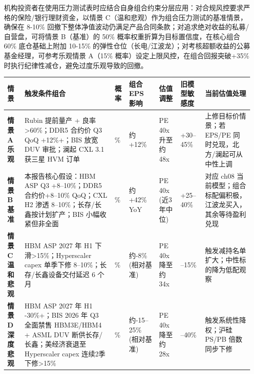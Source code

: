 机构投资者在使用压力测试表时应结合自身组合约束分层应用：对合规风控要求严格的保险/银行理财资金，以情景 C（温和悲观）作为组合压力测试的基准情景，确保在 8-10\% 回撤下整体净值波动仍满足产品合同条款；对追求绝对收益的私募/自营盘，可将情景 B（基准）的 50\% 概率权重折算为目标置信度，在核心组合 60\% 底仓基础上附加 10-15\% 的弹性仓位（长电/江波龙）；对考核超额收益的公募基金经理，可参考乐观情景 A（15\% 概率）设定上限风控，在组合回报突破+35\%时执行纪律性减仓，避免过度乐观导致的回撤。

\begin{exhibitbox}
\centering
\scriptsize
\renewcommand{\arraystretch}{1.25}
\begin{tabularx}{\exhibitboxwidth}{>{\bfseries}p{1.6cm} >{\raggedright\arraybackslash}p{3.8cm} >{\centering\arraybackslash}p{1.2cm} >{\raggedleft\arraybackslash}p{1.6cm} >{\raggedleft\arraybackslash}p{1.6cm} >{\raggedleft\arraybackslash}p{1.2cm} >{\raggedright\arraybackslash}X}
\toprule
\textbf{情景} & \textbf{触发条件组合} & \textbf{概率} & \textbf{组合 EPS 影响} & \textbf{估值调整} & \textbf{旧模型敏感度} & \textbf{当前估值处理} \\
\midrule
\rowcolor{riskgreen!6}
情景A 乐观 & Rubin 提前量产 + 良率 >60\%；DDR5 合约价 Q3 QoQ +12\%+；BIS 放宽 DUV 审批；澜起 CXL 3.1 获三星 HVM 订单 & 15\% & 约+12\% & PE 40x 升至约48x & +30--45\% & 上修目标价情景；若 EPS/PE 同时兑现，北方/澜起可从中性上调 \\
\midrule
情景B 基准 & 本报告核心假设：HBM ASP Q3 +8--10\%；DDR5 合约价+8--10\% QoQ；CXL H2 渗透 8--10\%；长存\slash 长鑫按计划扩产；BIS 小幅收紧但非全面 & 50\% & 约+42\% YoY & PE 40x (近3年中位) & +25--40\% & 对应 ch08 当前模型；组合标配偏积极，江波龙买入，其余等待盈利兑现 \\
\midrule
\rowcolor{riskamber!6}
情景C 温和悲观 & HBM ASP 2027 年 H1 下滑>15\%；Hyperscaler capex 单季下修 8--10\%；长存\slash 长鑫设备交付延迟 6 个月 & 27\% & 约-8\% (相对基准) & PE 40x 降至约34x & -10--15\% & 触发减持名单扩大；中性标的降为低配观察 \\
\midrule
\rowcolor{riskred!6}
情景D 深度悲观 & HBM ASP 2027 年 H1 -30\%+；BIS 2026 年 Q3 全面禁售 HBM3E/HBM4 + ASML DUV 断供长存\slash 长鑫；美经济衰退至 Hyperscaler capex 连续2季下修>15\% & 8\% & 约-15--25\% (相对基准) & PE 40x 降至约28x & -25--40\% & 触发系统性降权；沪硅 PS/PB 倍数同步下修 \\
\bottomrule
\end{tabularx}
\end{exhibitbox}

